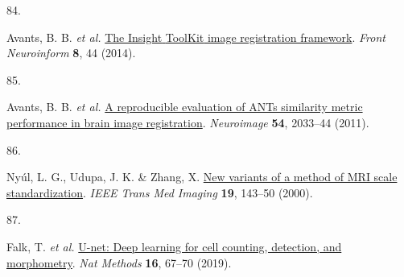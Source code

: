 \documentclass[
  12pt,
]{article}
\newlength{\cslhangindent}
\newlength{\csllabelwidth}
\newenvironment{CSLReferences}[2] %
 {\begin{list}{}{%
  \setlength{\itemindent}{0pt}
  \setlength{\leftmargin}{0pt}
  \setlength{\parsep}{0pt}
  \ifodd #1
   \setlength{\leftmargin}{\cslhangindent}
   \setlength{\itemindent}{-1\cslhangindent}
  \fi
  \setlength{\itemsep}{#2\baselineskip}}}
 {\end{list}}
\newcommand{\CSLLeftMargin}[1]{\parbox[t]{\csllabelwidth}{\strut#1\strut}}
\newcommand{\CSLRightInline}[1]{\parbox[t]{\linewidth - \csllabelwidth}{\strut#1\strut}}
\begin{document}
\begin{CSLReferences}{0}{0}
\CSLLeftMargin{84. }%
\CSLRightInline{Avants, B. B. \emph{et al.}
\href{https://doi.org/10.3389/fninf.2014.00044}{The {Insight} {ToolKit}
image registration framework}. \emph{Front Neuroinform} \textbf{8}, 44
(2014).}

\CSLLeftMargin{85. }%
\CSLRightInline{Avants, B. B. \emph{et al.}
\href{https://doi.org/10.1016/j.neuroimage.2010.09.025}{A reproducible
evaluation of ANTs similarity metric performance in brain image
registration}. \emph{Neuroimage} \textbf{54}, 2033--44 (2011).}

\CSLLeftMargin{86. }%
\CSLRightInline{Nyúl, L. G., Udupa, J. K. \& Zhang, X.
\href{https://doi.org/10.1109/42.836373}{New variants of a method of MRI
scale standardization}. \emph{IEEE Trans Med Imaging} \textbf{19},
143--50 (2000).}

\CSLLeftMargin{87. }%
\CSLRightInline{Falk, T. \emph{et al.}
\href{https://doi.org/10.1038/s41592-018-0261-2}{U-net: Deep learning
for cell counting, detection, and morphometry}. \emph{Nat Methods}
\textbf{16}, 67--70 (2019).}

\end{CSLReferences}
\end{document}
